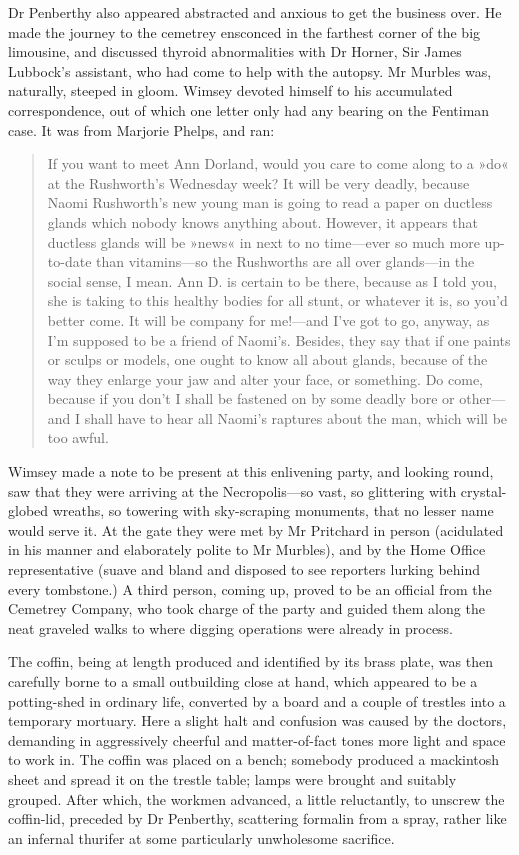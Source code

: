 Dr Penberthy also appeared abstracted and anxious to get the business over. He made the journey to the cemetrey ensconced in the farthest corner of the big limousine, and discussed thyroid abnormalities with Dr Horner, Sir James Lubbock's assistant, who had come to help with the autopsy. Mr Murbles was, naturally, steeped in gloom. Wimsey devoted himself to his accumulated correspondence, out of which one letter only had any bearing on the Fentiman case. It was from Marjorie Phelps, and ran:

\begin{quote}If you want to meet Ann Dorland, would you care to come along to a »do« at the Rushworth's Wednesday week? It will be very deadly, because Naomi Rushworth's new young man is going to read a paper on ductless glands which nobody knows anything about. However, it appears that ductless glands will be »news« in next to no time—ever so much more up-to-date than vitamins—so the Rushworths are all over glands—in the social sense, I mean. Ann D. is certain to be there, because as I told you, she is taking to this healthy bodies for all stunt, or whatever it is, so you'd better come. It will be company for me!—and I've got to go, anyway, as I'm supposed to be a friend of Naomi's. Besides, they say that if one paints or sculps or models, one ought to know all about glands, because of the way they enlarge your jaw and alter your face, or something. Do come, because if you don't I shall be fastened on by some deadly bore or other—and I shall have to hear all Naomi's raptures about the man, which will be too awful.
\end{quote}

Wimsey made a note to be present at this enlivening party, and looking round, saw that they were arriving at the Necropolis—so vast, so glittering with crystal-globed wreaths, so towering with sky-scraping monuments, that no lesser name would serve it. At the gate they were met by Mr Pritchard in person (acidulated in his manner and elaborately polite to Mr Murbles), and by the Home Office representative (suave and bland and disposed to see reporters lurking behind every tombstone.) A third person, coming up, proved to be an official from the Cemetrey Company, who took charge of the party and guided them along the neat graveled walks to where digging operations were already in process.

The coffin, being at length produced and identified by its brass plate, was then carefully borne to a small outbuilding close at hand, which appeared to be a potting-shed in ordinary life, converted by a board and a couple of trestles into a temporary mortuary. Here a slight halt and confusion was caused by the doctors, demanding in aggressively cheerful and matter-of-fact tones more light and space to work in. The coffin was placed on a bench; somebody produced a mackintosh sheet and spread it on the trestle table; lamps were brought and suitably grouped. After which, the workmen advanced, a little reluctantly, to unscrew the coffin-lid, preceded by Dr Penberthy, scattering formalin from a spray, rather like an infernal thurifer at some particularly unwholesome sacrifice.

